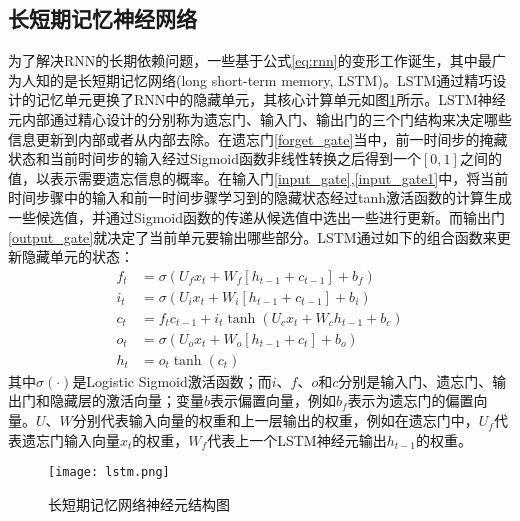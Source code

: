 \subsection{长短期记忆神经网络}
为了解决RNN的长期依赖问题，一些基于公式\ref{eq:rnn}的变形工作诞生，其中最广为人知的是长短期记忆网络(long short-term memory, LSTM)。LSTM通过精巧设计的记忆单元更换了RNN中的隐藏单元，其核心计算单元如图\ref{fig:lstm}所示。LSTM神经元内部通过精心设计的分别称为遗忘门、输入门、输出门的三个门结构来决定哪些信息更新到内部或者从内部去除。在遗忘门\eqref{forget_gate}当中，前一时间步的掩藏状态和当前时间步的输入经过Sigmoid函数非线性转换之后得到一个$[0,1]$之间的值，以表示需要遗忘信息的概率。在输入门\eqref{input_gate},\eqref{input_gate1}中，将当前时间步骤中的输入和前一时间步骤学习到的隐藏状态经过tanh激活函数的计算生成一些候选值，并通过Sigmoid函数的传递从候选值中选出一些进行更新。而输出门\eqref{output_gate}就决定了当前单元要输出哪些部分。LSTM通过如下的组合函数来更新隐藏单元的状态：
  \begin{align} 
  f_{t} &=\sigma(U_{f} x_{t}+W_{f}[h_{t-1}+ c_{t-1}] +b_{f}) \label{forget_gate}\\
  i_{t} &=\sigma(U_{i} x_{t}+W_{i}[h_{t-1}+ c_{t-1}]+b_{i}) \label{input_gate}\\  
  c_{t} &=f_{t} c_{t-1}+i_{t} \tanh (U_{c} x_{t}+W_{c} h_{t-1}+b_{c}) \label{input_gate1}\\ 
  o_{t} &=\sigma(U_{o} x_{t}+W_{o}[h_{t-1}+ c_{t}]+b_{o}) \label{output_gate}\\ 
  h_{t} &=o_{t} \tanh (c_{t}) 
  \end{align}
其中$\sigma(\cdot)$是Logistic Sigmoid激活函数；而$i$、$f$、$o$和$c$分别是输入门、遗忘门、输出门和隐藏层的激活向量；变量$b$表示偏置向量，例如$b_{f}$表示为遗忘门的偏置向量。$U$、$W$分别代表输入向量的权重和上一层输出的权重，例如在遗忘门中，$U_{f}$代表遗忘门输入向量$x_{t}$的权重，$W_{f}$代表上一个LSTM神经元输出$h_{t-1}$的权重。
  \begin{figure}[htb]
    \centering
    \texttt{[image: lstm.png]}\\
    \caption{长短期记忆网络神经元结构图}
    \label{fig:lstm}
  \end{figure}
